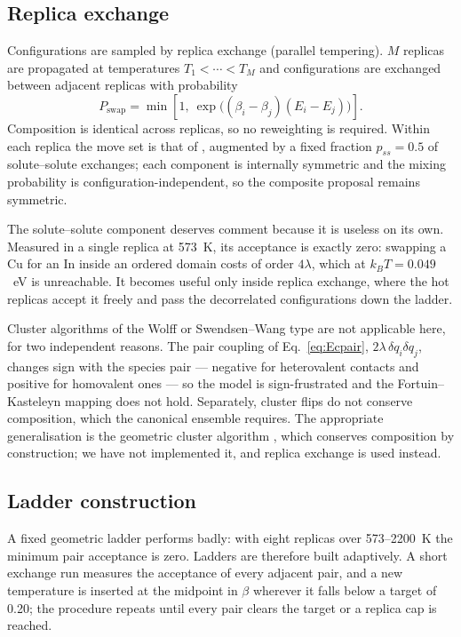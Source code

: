 \documentclass[11pt,a4paper]{article}
\begin{document}
\subsection{Replica exchange}
\label{sec:rex}

Configurations are sampled by replica exchange (parallel tempering). $M$
replicas are propagated at temperatures $T_1 < \cdots < T_M$ and configurations
are exchanged between adjacent replicas with probability
\begin{equation}
P_{\mathrm{swap}} = \min\!\left[1,\ \exp\!\big((\beta_i - \beta_j)(E_i - E_j)\big)\right].
\label{eq:swap}
\end{equation}
Composition is identical across replicas, so no reweighting is required. Within
each replica the move set is that of \citet{yu2026}, augmented by a fixed
fraction $p_{ss} = 0.5$ of solute--solute exchanges; each component is
internally symmetric and the mixing probability is configuration-independent, so
the composite proposal remains symmetric.

The solute--solute component deserves comment because it is useless on its own.
Measured in a single replica at 573~K, its acceptance is exactly zero: swapping
a Cu for an In inside an ordered domain costs of order $4\lambda$, which at
$k_BT = 0.049$~eV is unreachable. It becomes useful only inside replica
exchange, where the hot replicas accept it freely and pass the decorrelated
configurations down the ladder.

Cluster algorithms of the Wolff or Swendsen--Wang type are not applicable here,
for two independent reasons. The pair coupling of Eq.~\eqref{eq:Ecpair},
$2\lambda\,\delta q_i \delta q_j$, changes sign with the species pair --- negative
for heterovalent contacts and positive for homovalent ones --- so the model is
sign-frustrated and the Fortuin--Kasteleyn mapping does not hold. Separately,
cluster flips do not conserve composition, which the canonical ensemble
requires. The appropriate generalisation is the geometric cluster algorithm
\citep{dress1995,liu2004}, which conserves composition by construction; we
have not implemented it, and replica exchange is used instead.

\subsection{Ladder construction}
\label{sec:ladder}

A fixed geometric ladder performs badly: with eight replicas over 573--2200~K
the minimum pair acceptance is zero. Ladders are therefore built adaptively. A
short exchange run measures the acceptance of every adjacent pair, and a new
temperature is inserted at the midpoint in $\beta$ wherever it falls below a
target of 0.20; the procedure repeats until every pair clears the target or a
replica cap is reached.
\end{document}
